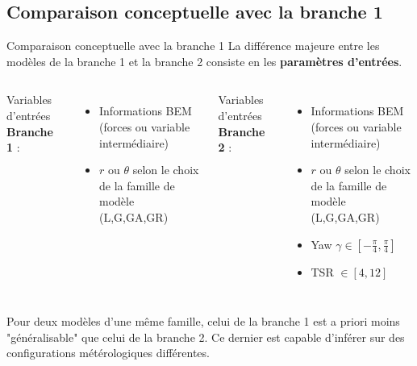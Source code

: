 \documentclass[
11pt,notheorems,hyperref={pdfauthor=whatever}
]{beamer}
\begin{document}
\subsection{Comparaison conceptuelle avec la branche 1}
\begin{frame}{Comparaison conceptuelle avec la branche 1}
La différence majeure entre les modèles de la branche 1 et la branche 2 consiste en les \textbf{paramètres d'entrées}. 

\vspace{1cm}

\begin{columns}[c]
        Variables d'entrées \textbf{Branche 1} :  
        \begin{itemize}\small
            \item Informations BEM (forces ou variable intermédiaire)
            \item $r$ ou $\theta$ selon le choix de la famille de modèle (L,G,GA,GR)
        \end{itemize}

        \centering

        Variables d'entrées \textbf{Branche 2} :
        \begin{itemize}\small
            \item Informations BEM (forces ou variable intermédiaire)
            \item $r$ ou $\theta$ selon le choix de la famille de modèle (L,G,GA,GR)
            \item Yaw $\gamma \in \left[-\frac{\pi}{4}, \frac{\pi}{4}\right]$
            \item TSR $\in \left[4, 12\right] $
        \end{itemize}
    \end{columns}

    \vspace{1cm}

    Pour deux modèles d'une même famille, celui de la branche 1 est a priori moins "généralisable" que celui de la branche 2. Ce dernier est capable d'inférer sur des configurations métérologiques 
    différentes.  
\end{frame}
\end{document}
